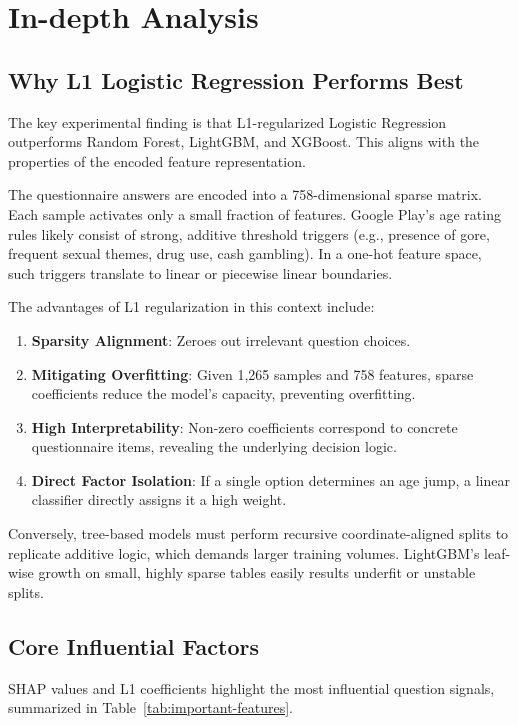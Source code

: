 \documentclass[11pt,a4paper]{article}
\begin{document}
\section{In-depth Analysis}

\subsection{Why L1 Logistic Regression Performs Best}

The key experimental finding is that L1-regularized Logistic Regression outperforms Random Forest, LightGBM, and XGBoost. This aligns with the properties of the encoded feature representation.

The questionnaire answers are encoded into a 758-dimensional sparse matrix. Each sample activates only a small fraction of features. Google Play's age rating rules likely consist of strong, additive threshold triggers (e.g., presence of gore, frequent sexual themes, drug use, cash gambling). In a one-hot feature space, such triggers translate to linear or piecewise linear boundaries.

The advantages of L1 regularization in this context include:
\begin{enumerate}[leftmargin=2em]
  \item \textbf{Sparsity Alignment}: Zeroes out irrelevant question choices.
  \item \textbf{Mitigating Overfitting}: Given 1,265 samples and 758 features, sparse coefficients reduce the model's capacity, preventing overfitting.
  \item \textbf{High Interpretability}: Non-zero coefficients correspond to concrete questionnaire items, revealing the underlying decision logic.
  \item \textbf{Direct Factor Isolation}: If a single option determines an age jump, a linear classifier directly assigns it a high weight.
\end{enumerate}

Conversely, tree-based models must perform recursive coordinate-aligned splits to replicate additive logic, which demands larger training volumes. LightGBM's leaf-wise growth on small, highly sparse tables easily results underfit or unstable splits.

\subsection{Core Influential Factors}

SHAP values and L1 coefficients highlight the most influential question signals, summarized in Table~\ref{tab:important-features}.
\end{document}
